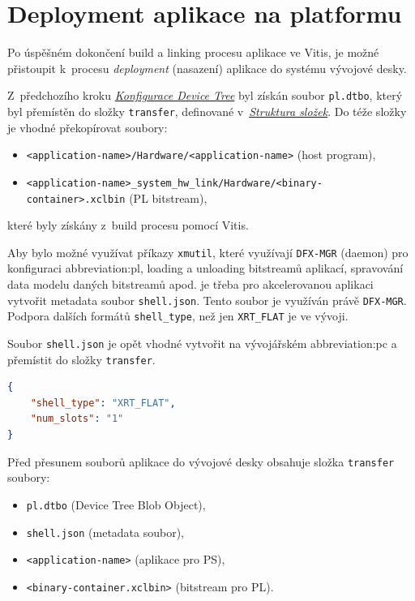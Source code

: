 \documentclass[a4paper, twoside, 11pt]{article}
\begin{document}
	\section{Deployment aplikace na platformu}
	Po úspěšném dokončení build a linking procesu aplikace ve Vitis, je možné přistoupit k~procesu \textit{deployment} (nasazení) aplikace do systému vývojové desky.\par
	Z~předchozího kroku \hyperref[subsubsec:konfigurace-device-tree]{\textit{Konfigurace Device Tree}} byl získán soubor \texttt{pl.dtbo}, který byl přemístěn do složky \texttt{transfer}, definované v~\hyperref[sec:struktura-slozek]{\textit{Struktura složek}}. Do téže složky je vhodné překopírovat soubory:
	\begin{itemize}
		\item \texttt{<application-name>/Hardware/<application-name>} (host program),
		\item \texttt{<application-name>\_system\_hw\_link/Hardware/<binary-container>.xclbin} (PL bitstream),
	\end{itemize}
	které byly získány z~build procesu pomocí Vitis.\par
	Aby bylo možné využívat příkazy \texttt{xmutil}, které využívají \texttt{DFX-MGR} (daemon) \cite{xilinx-github-dfx-mgr} pro konfiguraci \gls{abbreviation:pl}, loading a unloading bitstreamů aplikací, spravování data modelu daných bitstreamů apod. je třeba pro akcelerovanou aplikaci vytvořit metadata soubor \texttt{shell.json}. Tento soubor je využíván právě \texttt{DFX-MGR}. Podpora dalších formátů \texttt{shell\_type}, než jen \texttt{XRT\_FLAT} je ve vývoji. \cite{xilinx-github-vitis-tutorials-step-2-create-the-software-components}\par Soubor \texttt{shell.json} je opět vhodné vytvořit na vývojářském \gls{abbreviation:pc} a přemístit do složky \texttt{transfer}.\par

	\begin{lstlisting}[language={json}, caption={Metadata shell.json soubor pro xmutil.}, label={lst:metadata-shell-json}]
{
	"shell_type": "XRT_FLAT",
	"num_slots": "1"
}\end{lstlisting}
	
	\vspace*{0.35cm}
	Před přesunem souborů aplikace do vývojové desky obsahuje složka \texttt{transfer} soubory:
	\begin{itemize}
		\item \texttt{pl.dtbo} (Device Tree Blob Object),
		\item \texttt{shell.json} (metadata soubor),
		\item \texttt{<application-name>} (aplikace pro PS),
		\item \texttt{<binary-container.xclbin>} (bitstream pro PL). 
	\end{itemize}
	\vspace*{0.75cm}
\end{document}
